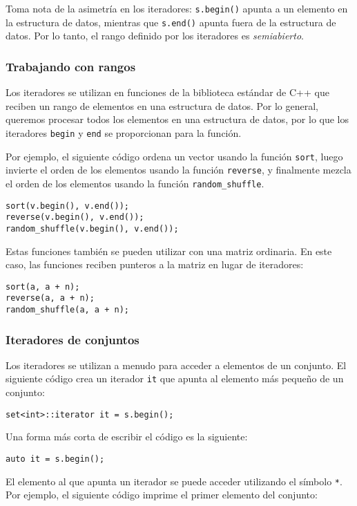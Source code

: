 Toma nota de la asimetría en los iteradores:
\texttt{s.begin()} apunta a un elemento en la estructura de datos,
mientras que \texttt{s.end()} apunta fuera de la estructura de datos.
Por lo tanto, el rango definido por los iteradores es \emph{semiabierto}.

\subsubsection{Trabajando con rangos}

Los iteradores se utilizan en funciones de la biblioteca estándar de C++
que reciben un rango de elementos en una estructura de datos.
Por lo general, queremos procesar todos los elementos en una
estructura de datos, por lo que los iteradores
\texttt{begin} y \texttt{end} se proporcionan para la función.

Por ejemplo, el siguiente código ordena un vector
usando la función \texttt{sort},
luego invierte el orden de los elementos usando la función
\texttt{reverse}, y finalmente mezcla el orden de
los elementos usando la función \texttt{random\_shuffle}.


\begin{lstlisting}
sort(v.begin(), v.end());
reverse(v.begin(), v.end());
random_shuffle(v.begin(), v.end());
\end{lstlisting}

\pagebreak
Estas funciones también se pueden utilizar con una matriz ordinaria.
En este caso, las funciones reciben punteros a la matriz
en lugar de iteradores:

\begin{lstlisting}
sort(a, a + n);
reverse(a, a + n);
random_shuffle(a, a + n);
\end{lstlisting}

\subsubsection{Iteradores de conjuntos}

Los iteradores se utilizan a menudo para acceder
a elementos de un conjunto.
El siguiente código crea un iterador
\texttt{it} que apunta al elemento más pequeño de un conjunto:
\begin{lstlisting}
set<int>::iterator it = s.begin();
\end{lstlisting}
Una forma más corta de escribir el código es la siguiente:
\begin{lstlisting}
auto it = s.begin();
\end{lstlisting}
El elemento al que apunta un iterador
se puede acceder utilizando el símbolo \texttt{*}.
Por ejemplo, el siguiente código imprime
el primer elemento del conjunto:

